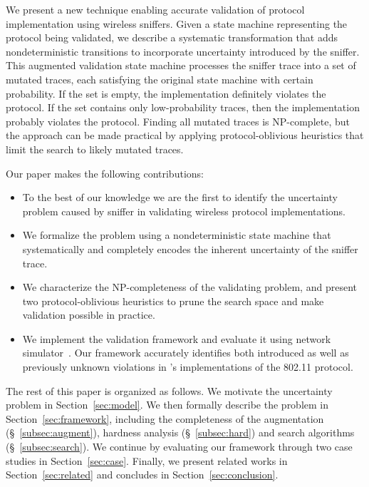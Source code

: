 We present a new technique enabling accurate validation of protocol
implementation using wireless sniffers.
Given a state machine representing the protocol being validated, we describe a
systematic transformation that adds nondeterministic transitions to
incorporate uncertainty introduced by the sniffer.
This augmented validation state machine processes the sniffer trace into a set
of mutated traces, each satisfying the original state machine with certain
probability.
If the set is empty, the implementation definitely violates the protocol.
If the set contains only low-probability traces, then the implementation
probably violates the protocol.
Finding all mutated traces is NP-complete, but the approach can be made
practical by applying protocol-oblivious heuristics that limit the search to
likely mutated traces.

Our paper makes the following contributions:
\begin{itemize}
		  \item To the best of our knowledge we are the first to identify the
    uncertainty problem caused by sniffer in validating wireless protocol
    implementations.
		  \item We formalize the problem using a nondeterministic state machine that
    systematically and completely encodes the inherent uncertainty of the
    sniffer trace.
		    \item We characterize the NP-completeness of the validating problem, and
      present two protocol-oblivious heuristics to prune the search
      space and make validation possible in practice.
			\item We implement the validation framework and evaluate it using
    \ns{} network simulator~\cite{riley2010ns}.
		    Our framework accurately identifies both introduced as well as previously
    unknown violations in \ns{}'s implementations of the 802.11 protocol.
		\end{itemize}

The rest of this paper is organized as follows.
We motivate the uncertainty problem in Section~\ref{sec:model}.
We then formally describe the problem in Section~\ref{sec:framework},
including the completeness of the augmentation (\S~\ref{subsec:augment}),
hardness analysis (\S~\ref{subsec:hard}) and search algorithms
(\S~\ref{subsec:search}).
We continue by evaluating our framework through two case studies in
Section~\ref{sec:case}.  Finally, we present related works in
Section~\ref{sec:related} and concludes in Section~\ref{sec:conclusion}.
